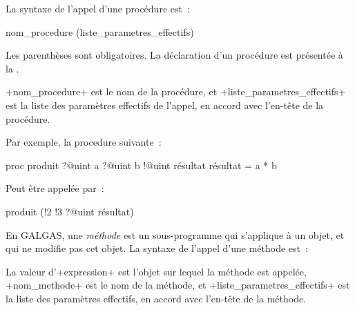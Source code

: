 %
















La syntaxe de l'appel d'une procédure est~:
\begin{galgas3box}
nom_procedure (liste_parametres_effectifs)
\end{galgas3box}

Les parenthèses sont obligatoires. La déclaration d'un procédure est présentée à la .

\ggst+nom_procedure+ est le nom de la procédure, et \ggst+liste_parametres_effectifs+ est la liste des paramètres effectifs de l'appel, en accord avec l'en-tête de la procédure.

Par exemple, la procedure suivante~:
\begin{galgas3}
proc produit ?@uint a ?@uint b !@uint résultat {
  résultat = a * b
}
\end{galgas3}

Peut être appelée par~:
\begin{galgas3}
produit (!2 !3 ?@uint résultat)
\end{galgas3}
















En GALGAS, une \emph{méthode} est un sous-programme qui s'applique à un objet, et qui ne modifie pas cet objet. La syntaxe de l'appel d'une méthode est~:
\begin{galgas3}
\end{galgas3}

La valeur d'\ggst+expression+ est l'objet sur lequel la méthode est appelée, \ggst+nom_methode+ est le nom de la méthode, et \ggst+liste_parametres_effectifs+ est la liste des paramètres effectifs, en accord avec l'en-tête de la méthode.

